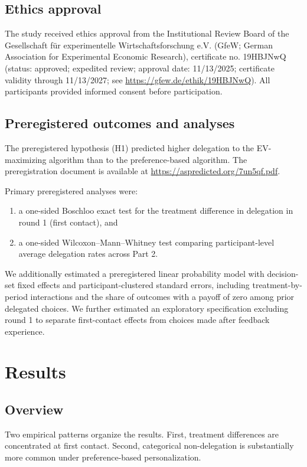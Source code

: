 \documentclass[a4paper, 12pt, fleqn]{article}
\theoremstyle{definition}
\begin{document}
\subsection{Ethics approval}
The study received ethics approval from the Institutional Review Board of the Gesellschaft für experimentelle Wirtschaftsforschung e.V. (GfeW; German Association for Experimental Economic Research), certificate no. 19HBJNwQ (status: approved; expedited review; approval date: 11/13/2025; certificate validity through 11/13/2027; see {\footnotesize\url{https://gfew.de/ethik/19HBJNwQ}}). All participants provided informed consent before participation.

\subsection{Preregistered outcomes and analyses}
The preregistered hypothesis (H1) predicted higher delegation to the EV-maximizing algorithm than to the preference-based algorithm.
The preregistration document is available at {\footnotesize\url{https://aspredicted.org/7un5qf.pdf}}.

Primary preregistered analyses were:
\begin{enumerate}
  \item a one-sided Boschloo exact test for the treatment difference in delegation in round 1 (first contact), and
  \item a one-sided Wilcoxon--Mann--Whitney test comparing participant-level average delegation rates across Part 2.
\end{enumerate}

We additionally estimated a preregistered linear probability model with decision-set fixed effects and participant-clustered standard errors, including treatment-by-period interactions and the share of outcomes with a payoff of zero among prior delegated choices. We further estimated an exploratory specification excluding round 1 to separate first-contact effects from choices made after feedback experience.

\section{Results}
\label{sec:results}

\subsection{Overview}
Two empirical patterns organize the results. First, treatment differences are concentrated at first contact. Second, categorical non-delegation is substantially more common under preference-based personalization.
\end{document}
